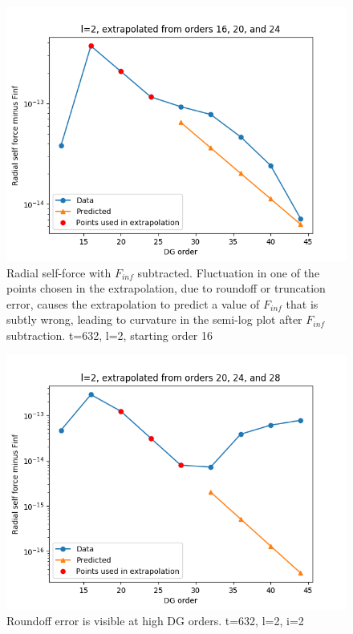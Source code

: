 \begin{figure}
  \includegraphics{extrapolate7t632l2i1}
  \caption{Radial self-force with $F_{inf}$ subtracted. Fluctuation in one of the points chosen in the extrapolation, due to roundoff or truncation error, causes the extrapolation to predict a value of $F_{inf}$ that is subtly wrong, leading to curvature in the semi-log plot after $F_{inf}$ subtraction. t=632, l=2, starting order 16}
  \label{nosoln}
\end{figure}

\begin{figure}
  \includegraphics{extrapolate7t632l2i2}
  \caption{Roundoff error is visible at high DG orders. t=632, l=2, i=2}
  \label{roundoff}
\end{figure}

